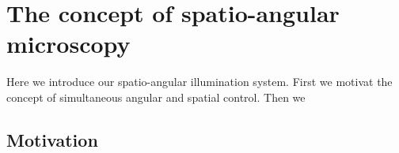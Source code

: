 \chapter{The concept of spatio-angular microscopy}
\label{sec:concept}
\begin{summary}
  Here we introduce our spatio-angular illumination system. First we
  motivat the concept of simultaneous angular and spatial
  control. Then we

\end{summary}
\section{Motivation}
